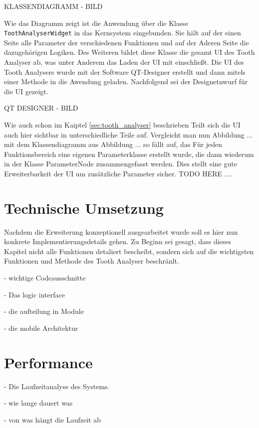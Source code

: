 KLASSENDIAGRAMM - BILD

Wie das Diagramm zeigt ist die Anwendung über die Klasse \texttt{ToothAnalyserWidget}
in das Kernsystem eingebunden. Sie hält auf der einen Seite alle Parameter der verschiedenen
Funktionen und auf der Aderen Seite die dazugehörigen Logiken. Des Weiteren
bildet diese Klasse die gesamt UI des Tooth Analyser ab, was unter Anderem das Laden
der \ac{UI} mit einschließt. Die UI des Tooth Analysers wurde mit der Software QT-Designer
erstellt und dann mitels einer Methode in die Awendung geladen. Nachfolgend sei
der Designetnwurf für die \ac{UI} gezeigt.

QT DESIGNER - BILD

Wie auch schon im Kaiptel \ref{sec:tooth_analyser} beschrieben Teilt sich die
\ac{UI} auch hier sichtbar in unterschiedliche Teile auf. Vergleicht man nun
Abbildung ... mit dem Klassendiagramm aus Abbildung ... so fällt auf, das Für jeden
Funktionsbereich eine eigenen Parameterklasse erstellt wurde, die dann wiederum
in der Klasse ParameterNode zusammengefasst werden. Dies stellt eine gute Erweiterbarkeit
der \ac{UI} um zusätzliche Parameter sicher. TODO HERE ....

\section{Technische Umsetzung}
\label{sec:technische_umsetzung} Nachdem die Erweiterung konzeptionell ausgearbeitet
wurde soll es hier nun konkrete Implementierungsdetails gehen. Zu Beginn sei
gesagt, dass dieses Kapitel nicht alle Funktionen detaliert bescheibt, sondern
sich auf die wichtigsten Funktionen und Methode des Tooth Analyser beschränlt.

- wichtige Codeausschnitte

- Das logic interface

- die aufteilung in Module

- die mobile Architektur

\section{Performance}
- Die Laufzeitanalyse des Systems.

- wie lange dauert was

- von was hängt die Laufzeit ab

